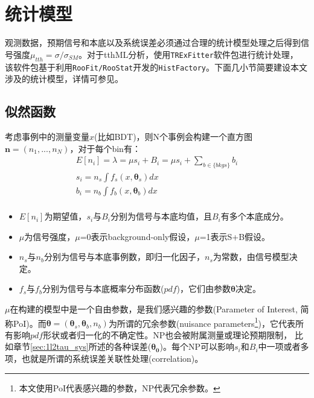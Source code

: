 \section{统计模型}\label{sec:stat_theory}
观测数据，预期信号和本底以及系统误差必须通过合理的统计模型处理之后得到信号强度$\mu_{tth}=\sigma/\sigma_{SM}$。对于tthML分析，使用\texttt{TRExFitter}\cite{TRExFitter}软件包进行统计处理，
该软件包基于利用\texttt{RooFit/RooStat}开发的\texttt{HistFactory}\cite{Cranmer:1456844}。下面几小节简要建设本文涉及的统计模型，详情可参见\cite{asym}。

\subsection{似然函数}
考虑事例中的测量变量$x$(比如BDT)，则N个事例会构建一个直方图$\boldsymbol{n}=(n_1,...,n_N)$，对于每个bin有：
\begin{equation}
\begin{aligned}
 E[n_i]=\lambda=\mu s_i+B_i=\mu s_i+\sum_{b\in {\{bkgs\}}}b_i \\
 s_i=n_s\int f_s(x, \boldsymbol{\theta}_s)dx  \\
 b_i=n_b\int f_b(x, \boldsymbol{\theta}_b)dx \\
\end{aligned}
\end{equation}
\begin{itemize}
  \item $E[n_i]$为期望值，$s_i$与$B_i$分别为信号与本底均值，且$B_i$有多个本底成分。
  \item $\mu$为信号强度，$\mu$=0表示background-only假设，$\mu$=1表示S+B假设。
  \item $n_s$与$n_b$分别为信号与本底事例数，即归一化因子，$n_s$为常数，由信号模型决定。
  \item $f_s$与$f_b$分别为信号与本底概率分布函数($pdf$)，它们由参数$\boldsymbol{\theta}$决定。
\end{itemize}
$\mu$在构建的模型中是一个自由参数，是我们感兴趣的参数(Parameter of Interest, 简称PoI)。而$\boldsymbol{\theta}=(\boldsymbol{\theta}_s,\boldsymbol{\theta}_b,n_b)$为所谓的冗余参数(nuisance parameters\footnote{本文使用PoI代表感兴趣的参数，NP代表冗余参数。})，它代表所有影响$pdf$形状或者归一化的不确定性。NP也会被附属测量或理论预期限制，
比如章节\ref{sec:1l2tau_sys}所述的各种误差($\boldsymbol{\theta_0}$)。每个NP可以影响$s_i$和$B_i$中一项或者多项，也就是所谓的系统误差关联性处理(correlation)。

